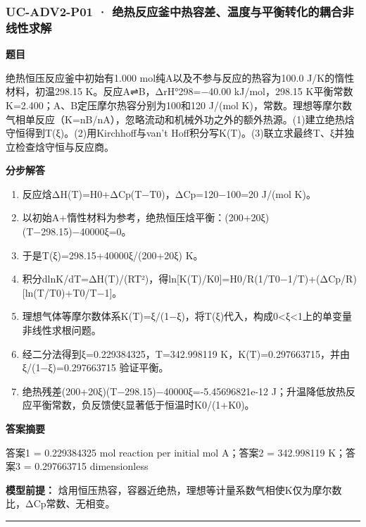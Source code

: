 \documentclass[UTF8,11pt,a4paper]{ctexart}
\begin{document}
\subsubsection*{UC-ADV2-P01 · 绝热反应釜中热容差、温度与平衡转化的耦合非线性求解}
\noindent\textbf{题目}\par
绝热恒压反应釜中初始有1.000 mol纯A以及不参与反应的热容为100.0 J/K的惰性材料，初温298.15 K。反应A⇌B，ΔrH°298=−40.00 kJ/mol，298.15 K平衡常数K=2.400；A、B定压摩尔热容分别为100和120 J/(mol K)，常数。理想等摩尔数气相单反应（K=nB/nA），忽略流动和机械外功之外的额外热源。(1)建立绝热焓守恒得到T(ξ)。(2)用Kirchhoff与van't Hoff积分写K(T)。(3)联立求最终T、ξ并独立检查焓守恒与反应商。\par
\medskip\noindent\textbf{分步解答}
\begin{enumerate}
\item 反应焓ΔH(T)=H0+ΔCp(T−T0)，ΔCp=120−100=20 J/(mol K)。
\item 以初始A+惰性材料为参考，绝热恒压焓平衡：(200+20ξ)(T−298.15)−40000ξ=0。
\item 于是T(ξ)=298.15+40000ξ/(200+20ξ) K。
\item 积分dlnK/dT=ΔH(T)/(RT²)，得ln[K(T)/K0]=H0/R(1/T0−1/T)+(ΔCp/R)[ln(T/T0)+T0/T−1]。
\item 理想气体等摩尔数体系K(T)=ξ/(1−ξ)，将T(ξ)代入，构成0<ξ<1上的单变量非线性求根问题。
\item 经二分法得到ξ=0.229384325，T=342.998119 K，K(T)=0.297663715，并由ξ/(1−ξ)=0.297663715 验证平衡。
\item 绝热残差(200+20ξ)(T−298.15)−40000ξ=-5.45696821e-12 J；升温降低放热反应平衡常数，负反馈使ξ显著低于恒温时K0/(1+K0)。
\end{enumerate}
\noindent\textbf{答案摘要}\par
答案1 = 0.229384325 mol reaction per initial mol A；答案2 = 342.998119 K；答案3 = 0.297663715 dimensionless\par
\noindent\textbf{模型前提：}
焓用恒压热容，容器近绝热，理想等计量系数气相使K仅为摩尔数比，ΔCp常数、无相变。\par
\medskip\hrule\medskip
{}
\end{document}

